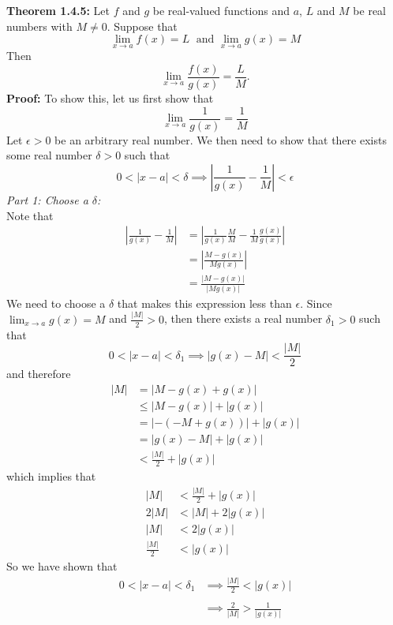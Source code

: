 \documentclass{article}
\begin{document}
	\textbf{Theorem 1.4.5:} Let $f$ and $g$ be real-valued functions and $a$, $L$ and $M$ be real numbers with $M \neq 0$. Suppose that
	$$\lim_{x \to a}{f(x)} = L \; \text{ and } \lim_{x \to a}{g(x)} = M$$
	Then
	$$\lim_{x \to a}{\frac{f(x)}{g(x)}} = \frac{L}{M}.$$
	\textbf{Proof:}
	To show this, let us first show that
	$$\lim_{x \to a}{\frac{1}{g(x)}} = \frac{1}{M}$$
	Let $\epsilon > 0$ be an arbitrary real number. We then need to show that there exists some real number $\delta > 0$ such that
	$$0 < |x - a| < \delta \implies \left|\frac{1}{g(x)} - \frac{1}{M}\right| < \epsilon$$
	\textit{Part 1: Choose a $\delta$:} \\
	Note that
	\begin{align*}
		\left|\frac{1}{g(x)} - \frac{1}{M}\right| &= \left|\frac{1}{g(x)}\frac{M}{M} - \frac{1}{M}\frac{g(x)}{g(x)}\right| \tag{$M \neq 0 \implies g(x) \neq 0$} \\
		                               &= \left|\frac{M - g(x)}{Mg(x)} \right| \\
		                               &= \frac{|M - g(x)|}{|Mg(x)|}
	\end{align*}
	We need to choose a $\delta$ that makes this expression less than $\epsilon$. Since $\lim_{x \to a}{g(x)} = M$ and $\frac{|M|}{2} > 0$, then there exists a real number $\delta_{1} > 0$ such that
	$$0 < |x - a| < \delta_{1} \implies |g(x) - M| < \frac{|M|}{2}$$
	and therefore
	\begin{align*}
		|M| &= |M - g(x) + g(x)| \\
		    &\leq |M - g(x)| + |g(x)| \tag{Triangle Ineq.} \\
		    &= |-(-M + g(x))| + |g(x)| \\
		    &= |g(x) - M| + |g(x)| \\
		    &< \frac{|M|}{2} + |g(x)|
	\end{align*}
	which implies that
	\begin{align*}
		|M| &< \frac{|M|}{2} + |g(x)| \\
		2|M| &< |M| + 2|g(x)| \\
		|M| &< 2|g(x)| \\
		\frac{|M|}{2} &< |g(x)|
	\end{align*}
	So we have shown that
	\begin{align*}
	0 < |x - a| < \delta_{1} &\implies \frac{|M|}{2} < |g(x)| \\\\
	                         &\implies \frac{2}{|M|} > \frac{1}{|g(x)|}
	\end{align*}
\end{document}
